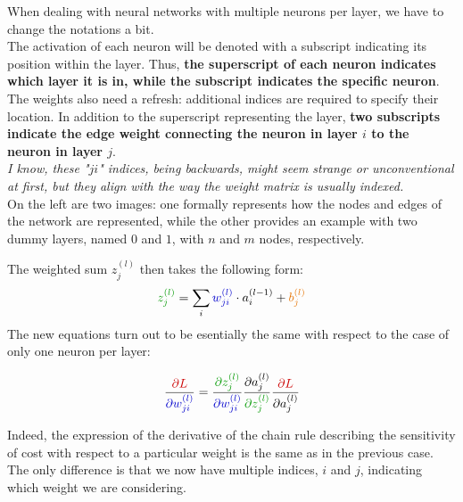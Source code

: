 \begin{minipage}{0.55\textwidth}
When dealing with neural networks with multiple neurons per layer, we have to change the notations a bit.\\

The activation of each neuron will be denoted with a subscript indicating its position within the layer. Thus, \textbf{the superscript of each neuron indicates which layer it is in, while the subscript indicates the specific neuron}.\\

The weights also need a refresh: additional indices are required to specify their location. In addition to the superscript representing the layer, \textbf{two subscripts indicate the edge weight connecting the neuron in layer $i$ to the neuron in layer $j$}.\\

\textit{I know, these "$ji$" indices, being backwards, might seem strange or unconventional at first, but they align with the way the weight matrix is usually indexed.}\\

On the left are two images: one formally represents how the nodes and edges of the network are represented, while the other provides an example with two dummy layers, named $0$ and $1$, with $n$ and $m$ nodes, respectively.
\end{minipage}

\newpage
The weighted sum \textcolor{mygreen}{$z_{j}^{(l)}$} then takes the following form:
$$
\textcolor{mygreen}{z_{j}^{(l)}} = \sum_{i} \textcolor{myblue}{w_{ji}^{(l)}} \cdot a_i^{(l-1)} + \textcolor{myorange}{b_{j}^{(l)}}
$$
The new equations turn out to be esentially the same with respect to the case of only one neuron per layer:

\vspace{-0.4cm}
$$
\frac{\textcolor{myred}{\partial L}}{\textcolor{myblue}{\partial w_{ji}^{(l)}}} = \frac{\textcolor{mygreen}{\partial z_{j}^{(l)}}}{\textcolor{myblue}{\partial w_{ji}^{(l)}}}  
\frac{\partial a_{j}^{(l)}}{\textcolor{mygreen}{\partial z_{j}^{(l)}}} \frac{\textcolor{myred}{\partial L}}{\partial a_{j}^{(l)}}
$$

Indeed, the expression of the derivative of the chain rule describing the sensitivity of cost with respect to a particular weight is the same as in the previous case. The only difference is that we now have multiple indices, $i$ and $j$, indicating which weight we are considering.


